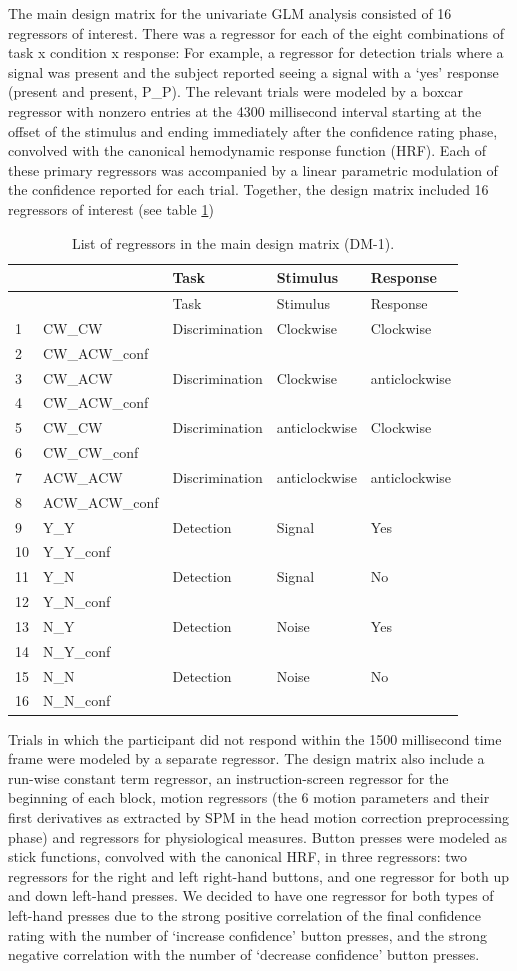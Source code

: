 \documentclass[12pt,twoside]{reedthesis}
\begin{document}
The main design matrix for the univariate GLM analysis consisted of 16 regressors of interest. There was a regressor for each of the eight combinations of task x condition x response: For example, a regressor for detection trials where a signal was present and the subject reported seeing a signal with a `yes' response (present and present, P\_P). The relevant trials were modeled by a boxcar regressor with nonzero entries at the 4300 millisecond interval starting at the offset of the stimulus and ending immediately after the confidence rating phase, convolved with the canonical hemodynamic response function (HRF).
Each of these primary regressors was accompanied by a linear parametric modulation of the confidence reported for each trial. Together, the design matrix included 16 regressors of interest (see table \ref{tab:ch3DM1})
\begin{longtable}[]{@{}lllll@{}}
\caption{\label{tab:ch3DM1} List of regressors in the main design matrix (DM-1).}\tabularnewline
\toprule
& & Task & Stimulus & Response\tabularnewline
\midrule
\endfirsthead
\toprule
& & Task & Stimulus & Response\tabularnewline
\midrule
\endhead
1 & CW\_CW & Discrimination & Clockwise & Clockwise\tabularnewline
2 & CW\_ACW\_conf & & &\tabularnewline
3 & CW\_ACW & Discrimination & Clockwise & anticlockwise\tabularnewline
4 & CW\_ACW\_conf & & &\tabularnewline
5 & CW\_CW & Discrimination & anticlockwise & Clockwise\tabularnewline
6 & CW\_CW\_conf & & &\tabularnewline
7 & ACW\_ACW & Discrimination & anticlockwise & anticlockwise\tabularnewline
8 & ACW\_ACW\_conf & & &\tabularnewline
9 & Y\_Y & Detection & Signal & Yes\tabularnewline
10 & Y\_Y\_conf & & &\tabularnewline
11 & Y\_N & Detection & Signal & No\tabularnewline
12 & Y\_N\_conf & & &\tabularnewline
13 & N\_Y & Detection & Noise & Yes\tabularnewline
14 & N\_Y\_conf & & &\tabularnewline
15 & N\_N & Detection & Noise & No\tabularnewline
16 & N\_N\_conf & & &\tabularnewline
\bottomrule
\end{longtable}
Trials in which the participant did not respond within the 1500 millisecond time frame were modeled by a separate regressor. The design matrix also include a run-wise constant term regressor, an instruction-screen regressor for the beginning of each block, motion regressors (the 6 motion parameters and their first derivatives as extracted by SPM in the head motion correction preprocessing phase) and regressors for physiological measures. Button presses were modeled as stick functions, convolved with the canonical HRF, in three regressors: two regressors for the right and left right-hand buttons, and one regressor for both up and down left-hand presses. We decided to have one regressor for both types of left-hand presses due to the strong positive correlation of the final confidence rating with the number of `increase confidence' button presses, and the strong negative correlation with the number of `decrease confidence' button presses.
\end{document}
